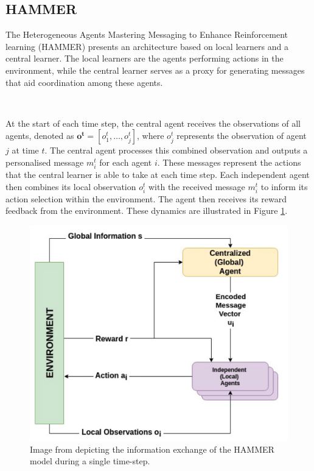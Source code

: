 \documentclass{article}
\begin{document}
\subsection{HAMMER}

The Heterogeneous Agents Mastering Messaging to Enhance Reinforcement learning (HAMMER) \citep{gupta2022HAMMER} presents an architecture based on local learners and a central learner. The local learners are the agents performing actions in the environment, while the central learner serves as a proxy for generating messages that aid coordination among these agents. 

\

At the start of each time step, the central agent receives the observations of all agents, denoted as $\mathbf{o^t} = [o_1^t, \hdots, o_j^t]$, where $o_j^t$ represents the observation of agent $j$ at time $t$. The central agent processes this combined observation and outputs a personalised message $m_i^t$ for each agent $i$. These messages represent the actions that the central learner is able to take at each time step. Each independent agent then combines its local observation $o_i^t$ with the received message $m_i^t$ to inform its action selection within the environment. The agent then receives its reward feedback from the environment. These dynamics are illustrated in Figure \ref{fig:hammer}.

\begin{figure}
	\centering
	\includegraphics[scale=0.5]{images/hammer}
	\caption{Image from \citet{gupta2022HAMMER} depicting the information exchange of the HAMMER model during a single time-step.}
	\label{fig:hammer}
\end{figure}
\end{document}
